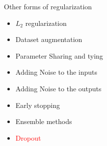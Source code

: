 \begin{frame}
\end{frame}

\begin{frame}
	\vspace{4em}
	\begin{overlayarea}{\textwidth}{\textheight}
		\begin{block}{Other forms of regularization}
			\begin{itemize}
				\item $L_2$ regularization
				\item Dataset augmentation
				\item Parameter Sharing and tying
				\item Adding Noise to the inputs
				\item Adding Noise to the outputs 
				\item Early stopping
				\item Ensemble methods
				\item \textcolor<2->{red}{Dropout}
			\end{itemize}
		\end{block}
	\end{overlayarea}
\end{frame}


